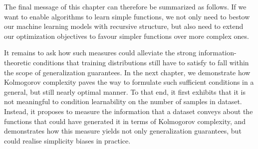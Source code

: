 The final message of this chapter can therefore be summarized as follows.
If we want to enable algorithms to learn simple functions, we not only need to bestow our machine learning models with recursive structure, but also need to extend our optimization objectives to favour simpler functions over more complex ones.

It remains to ask how such measures could alleviate the strong information-theoretic conditions that training distributions still have to satisfy to fall within the scope of generalization guarantees.
In the next chapter, we demonstrate how Kolmogorov complexity paves the way to formulate such sufficient conditions in a general, but still nearly optimal manner.
To that end, it first exhibits that it is not meaningful to condition learnability on the number of samples in dataset. 
Instead, it proposes to measure the information that a dataset conveys about the functions that could have generated it in terms of Kolmogorov complexity, and demonstrates how this measure yields not only generalization guarantees, but could realise simplicity biases in practice.